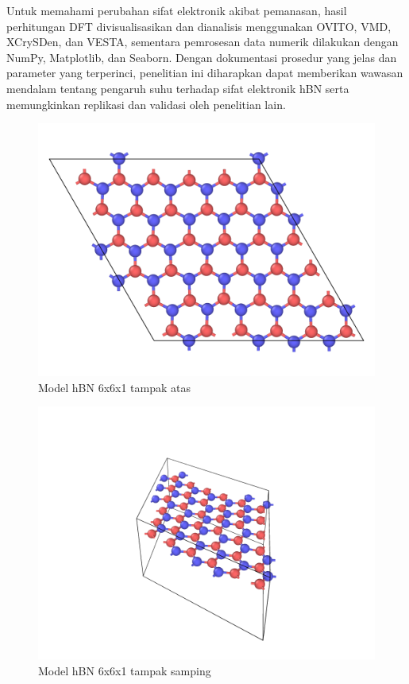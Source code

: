 Untuk memahami perubahan sifat elektronik akibat pemanasan, hasil perhitungan DFT divisualisasikan dan dianalisis menggunakan OVITO, VMD, XCrySDen, dan VESTA, sementara pemrosesan data numerik dilakukan dengan NumPy, Matplotlib, dan Seaborn. Dengan dokumentasi prosedur yang jelas dan parameter yang terperinci, penelitian ini diharapkan dapat memberikan wawasan mendalam tentang pengaruh suhu terhadap sifat elektronik hBN serta memungkinkan replikasi dan validasi oleh penelitian lain.

\vspace{3mm}

\begin{figure}
    \centering
    \includegraphics[width=0.5\linewidth]{gambar/500K.png}
    \caption{Model hBN 6x6x1 tampak atas}
    \label{fig:enter-label}
\end{figure}

\begin{figure}
    \centering
    \includegraphics[width=0.5\linewidth]{halaman-depan/500K_per.png}
    \caption{Model hBN 6x6x1 tampak samping}
    \label{fig:enter-label}
\end{figure}


